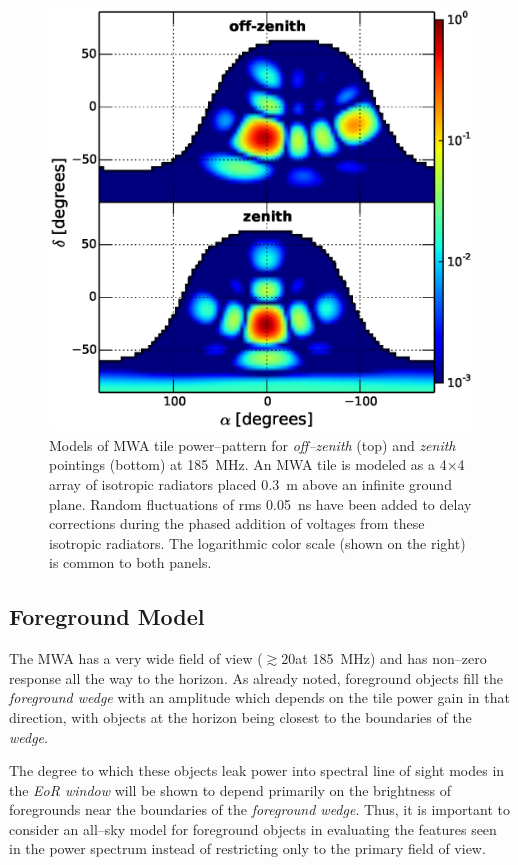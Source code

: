 \documentclass[preprint2,iop,numberedappendix]{emulateapj}
\begin{document}
\begin{figure}[htb]
\centering
\includegraphics[width=\linewidth]{figures/v1_0/delta_array_powerpattern_0.3m_ground_custom.eps}
\caption{Models of MWA tile power--pattern for {\it off--zenith} (top) and {\it zenith} pointings (bottom) at 185~MHz. An MWA tile is modeled as a 4$\times$4 array of isotropic radiators placed 0.3~m above an infinite ground plane. Random fluctuations of rms 0.05~ns have been added to delay corrections during the phased addition of voltages from these isotropic radiators. The logarithmic color scale (shown on the right) is common to both panels. \label{fig:power_pattern}}
\end{figure}

\subsection{Foreground Model}\label{sec:foreground}

The MWA has a very wide field of view ($\gtrsim 20$\arcdeg at 185~MHz) and has non--zero response all the way to the horizon. As already noted, foreground objects fill the {\it foreground wedge} with an amplitude which depends on the tile power gain in that direction, with objects at the horizon being closest to the boundaries of the {\it wedge}. 

The degree to which these objects leak power into spectral line of sight modes in the {\it EoR window} will be shown to depend primarily on the brightness of foregrounds near the boundaries of the {\it foreground wedge}. Thus, it is important to consider an all--sky model for foreground objects in evaluating the features seen in the power spectrum instead of restricting only to the primary field of view. 
\end{document}
